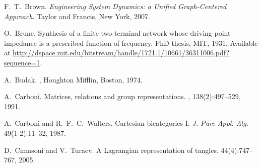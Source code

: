 \begin{thebibliography}{RSW00}
    F.\ T.\ Brown.
    \newblock \textsl{Engineering System Dynamics: a 
    Unified Graph-Centered Approach}. Taylor and Francis, New York, 2007. 

    O.\ Brune.
    \newblock Synthesis of a finite two-terminal network whose
    driving-point impedance is a prescribed function of frequency. PhD
    thesis, MIT, 1931.
    \newblock Available at
    \href{http://dspace.mit.edu/bitstream/handle/1721.1/10661/36311006.pdf?sequence=1}
    {http://dspace.mit.edu/bitstream/handle/1721.1/10661/36311006.pdf? sequence=1}.

%

    A.\ Budak.
    , Houghton Mifflin, Boston, 1974.




    A.\ Carboni.
    \newblock Matrices, relations and group representations.
    , 138(2):497--529, 1991.

    A.\ Carboni and R.\ F.\ C.\ Walters.
    \newblock Cartesian bicategories I.
    \newblock \textsl{J. Pure Appl. Alg.} { 49}(1-2):11--32, 1987. 

    D.\ Cimasoni and V.\ Turaev.
    \newblock A Lagrangian representation of tangles.
     { 44}(4):747--767, 2005. 
    

\end{thebibliography}
